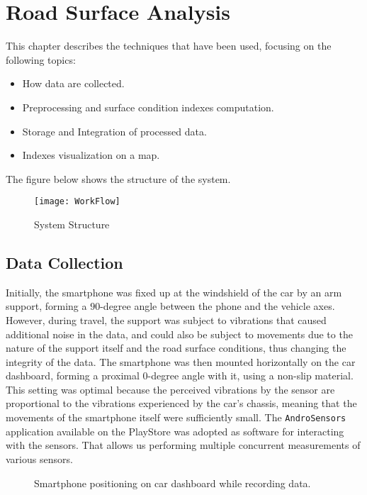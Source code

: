 \documentclass[tesi]{subfiles}
\begin{document}
\chapter{Road Surface Analysis}
\label{ch:System Development}
This chapter describes the techniques that have been used, focusing on the following topics:

\begin{itemize}
\item How data are collected.
\item Preprocessing and surface condition indexes computation.
\item Storage and Integration of processed data.
\item Indexes visualization on a map.
\end{itemize}

\clearpage The figure below shows the structure of the system.
\begin{figure}[H]
\centering
\texttt{[image: WorkFlow]}
\caption{System Structure}

\end{figure}\label{fig:System Structure}

\section{Data Collection}\label{sc:Data Collect}
Initially, the smartphone was fixed up at the windshield of the car by an arm support, forming a $90$-degree angle between the phone and the vehicle axes.
However, during travel, the support was subject to vibrations that caused additional noise in the data, and could also be subject to movements due to the nature of the support itself and the road surface conditions, thus changing the integrity of the data.
The smartphone was then mounted horizontally on the car dashboard, forming a proximal $0$-degree angle with it, using a non-slip material. This setting was optimal because the perceived vibrations by the sensor are proportional to the vibrations experienced by the car's chassis, meaning that the movements of the smartphone itself were sufficiently small.
The \texttt{AndroSensors} application available on the PlayStore was adopted as software for interacting with the sensors. That allows us  performing multiple concurrent measurements of various sensors.

\begin{figure}[H]
 \centering

  
  
  \caption{Smartphone positioning on car dashboard while recording data.}
\end{figure}\label{fig:Smarphone Data Recording}
\end{document}
